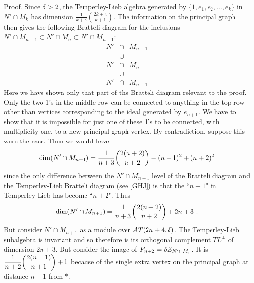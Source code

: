 \bs
{\sc Proof.} Since $\delta >2$, the Temperley-Lieb algebra generated
by $\{1,e_1,e_2,\dots ,e_k\}$ in $N'\cap M_k$ has dimension
$\frac{1}{k+2}{2k+4 \choose k+1}$. The information on
the principal graph then gives the following Bratteli diagram for
the inclusions $N'\cap M_{n-1}\subset N'\cap M_n\subset
N'\cap M_{n+1}$:
\begin{eqnarray*}
N'&\cap & M_{n+1} \\
&\cup &\\
N'&\cap & M_n\\
&\cup&\\
N'&\cap & M_{n-1}
\end{eqnarray*}
Here we have shown only that part of the Bratteli diagram relevant
to the proof. Only the two 1's in the middle row can be connected
to anything in the top row other than vertices corresponding to the
ideal generated by $e_{n+1}$. We have to show that it is impossible
for just one of these 1's to be connected, with multiplicity one,
to a new principal graph vertex. By contradiction, suppose this
were the case. Then we would have
$$
{\bf\rm{dim}}(N'\cap M_{n+1})=\frac{1}{n+3}
{2(n+2)\choose n+2} -(n+1)^2+(n+2)^2
$$
since the only difference between the $N'\cap M_{n+1}$ level
of the Bratteli diagram and the Temperley-Lieb Bratteli diagram
(see [GHJ]) is that the ``$n+1$" in Temperley-Lieb has become
``$n+2$".  Thus
$$
{\bf\rm{dim}}(N'\cap M_{n+1})=\frac{1}{n+3}
{2(n+2)\choose n+2} +2n+3 \ .
$$
But consider $N'\cap M_{n+1}$ as a module over $AT(2n+4,\delta)$.
The Temperley-Lieb subalgebra is invariant and so therefore is its
orthogonal complement $TL^{\perp}$ of dimension $2n+3$. But
consider the image of $F_{n+2}=\delta E_{N'\cap M_n}$. It is
$\displaystyle{\frac{1}{n+2}{2(n+1)\choose n+1} +1}$ because of the
single extra vertex on the principal graph at distance $n+1$ from $*$.


